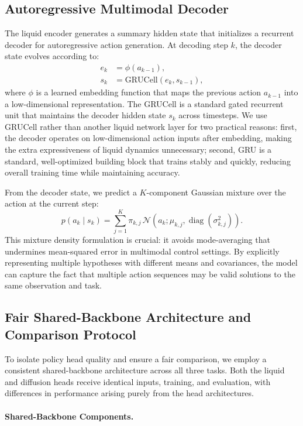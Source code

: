 \documentclass{article}
\begin{document}
\subsection{Autoregressive Multimodal Decoder}
The liquid encoder generates a summary hidden state that initializes a recurrent decoder for autoregressive action generation. At decoding step $k$, the decoder state evolves according to:
\begin{align}
e_k &= \phi(a_{k-1}), \\
s_k &= \mathrm{GRUCell}(e_k,s_{k-1}),
\end{align}
where $\phi$ is a learned embedding function that maps the previous action $a_{k-1}$ into a low-dimensional representation. The GRUCell is a standard gated recurrent unit that maintains the decoder hidden state $s_k$ across timesteps. We use GRUCell rather than another liquid network layer for two practical reasons: first, the decoder operates on low-dimensional action inputs after embedding, making the extra expressiveness of liquid dynamics unnecessary; second, GRU is a standard, well-optimized building block that trains stably and quickly, reducing overall training time while maintaining accuracy.

From the decoder state, we predict a $K$-component Gaussian mixture over the action at the current step:
\begin{equation}
p(a_k\mid s_k)=\sum_{j=1}^{K}\pi_{k,j}\,\mathcal{N}\!\left(a_k;\mu_{k,j},\operatorname{diag}(\sigma^2_{k,j})\right).
\end{equation}
This mixture density formulation is crucial: it avoids mode-averaging that undermines mean-squared error in multimodal control settings. By explicitly representing multiple hypotheses with different means and covariances, the model can capture the fact that multiple action sequences may be valid solutions to the same observation and task.

\subsection{Fair Shared-Backbone Architecture and Comparison Protocol}

To isolate policy head quality and ensure a fair comparison, we employ a consistent shared-backbone architecture across all three tasks. Both the liquid and diffusion heads receive identical inputs, training, and evaluation, with differences in performance arising purely from the head architectures.

\paragraph{Shared-Backbone Components.}
\end{document}
